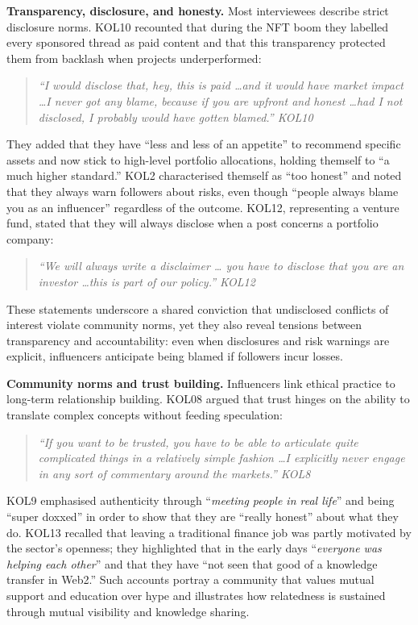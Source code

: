 \noindent\textbf{Transparency, disclosure, and honesty.} Most interviewees describe strict disclosure norms.  KOL10 recounted that during the NFT boom they labelled every sponsored thread as paid content and that this transparency protected them from backlash when projects underperformed: 
\begin{quote}\itshape
``I would disclose that, hey, this is paid \ldots and it would have market impact \ldots I never got any blame, because if you are upfront and honest \ldots had I not disclosed, I probably would have gotten blamed.'' \textemdash{} KOL10
\end{quote}
They added that they have ``less and less of an appetite'' to recommend specific assets and now stick to high-level portfolio allocations, holding themself to ``a much higher standard.''  KOL2 characterised themself as ``too honest'' and noted that they always warn followers about risks, even though ``people always blame you as an influencer'' regardless of the outcome.  KOL12, representing a venture fund, stated that they will always disclose when a post concerns a portfolio company: 
\begin{quote}\itshape
``We will always write a disclaimer … you have to disclose that you are an investor \ldots this is part of our policy.''  \textemdash{} KOL12
\end{quote}
These statements underscore a shared conviction that undisclosed conflicts of interest violate community norms, yet they also reveal tensions between transparency and accountability: even when disclosures and risk warnings are explicit, influencers anticipate being blamed if followers incur losses.

\noindent\textbf{Community norms and trust building.} Influencers link ethical practice to long-term relationship building.  KOL08 argued that trust hinges on the ability to translate complex concepts without feeding speculation:  
\begin{quote}\itshape
``If you want to be trusted, you have to be able to articulate quite complicated things in a relatively simple fashion \ldots I explicitly never engage in any sort of commentary around the markets.''  \textemdash{} KOL8
\end{quote}
KOL9 emphasised authenticity through ``\emph{meeting people in real life}'' and being ``super doxxed'' in order to show that they are ``really honest'' about what they do.  KOL13 recalled that leaving a traditional finance job was partly motivated by the sector's openness; they highlighted that in the early days ``\emph{everyone was helping each other}'' and that they have ``not seen that good of a knowledge transfer in Web2.''  Such accounts portray a community that values mutual support and education over hype and illustrates how relatedness is sustained through mutual visibility and knowledge sharing.

